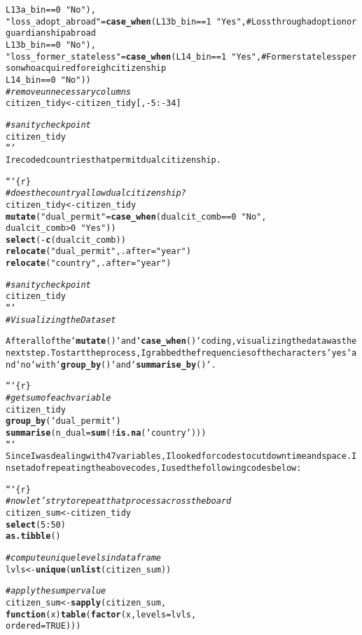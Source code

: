 \documentclass{article}\usepackage[]{graphicx}\usepackage[]{xcolor}
\makeatletter
\newcommand{\hlstr}[1]{\textcolor[rgb]{0.192,0.494,0.8}{#1}}%
\newcommand{\hlcom}[1]{\textcolor[rgb]{0.678,0.584,0.686}{\textit{#1}}}%
\newcommand{\hlkwd}[1]{\textcolor[rgb]{0.737,0.353,0.396}{\textbf{#1}}}%
\newenvironment{kframe}{%
 \def\at@end@of@kframe{}%
 \ifinner\ifhmode%
  \def\at@end@of@kframe{\end{minipage}}%
  \begin{minipage}{\columnwidth}%
 \fi\fi%
 \def\FrameCommand##1{\hskip\@totalleftmargin \hskip-\fboxsep
 \colorbox{shadecolor}{##1}\hskip-\fboxsep
     \hskip-\linewidth \hskip-\@totalleftmargin \hskip\columnwidth}%
 \MakeFramed {\advance\hsize-\width
   \@totalleftmargin\z@ \linewidth\hsize
   \@setminipage}}%
 {\par\unskip\endMakeFramed%
 \at@end@of@kframe}
\newenvironment{knitrout}{}{} %
\makeatother
\begin{document}
\begin{knitrout}
\begin{kframe}
\begin{alltt}
                                         L13a_bin == 0 ~ \hlstr{"No"}),
         \hlstr{"loss_adopt_abroad"} = \hlkwd{case_when}(L13b_bin == 1 ~ \hlstr{"Yes"}, # Loss through adoption or guardianship abroad
                                         L13b_bin == 0 ~ \hlstr{"No"}),
         \hlstr{"loss_former_stateless"} = \hlkwd{case_when}(L14_bin == 1 ~ \hlstr{"Yes"}, # Former stateless person who acquired foreigh citizenship
                                             L14_bin == 0 ~ \hlstr{"No"}))
\hlcom{# remove unnecessary columns }
citizen_tidy <- citizen_tidy[,-5:-34]

\hlcom{# sanity check point}
citizen_tidy
```
I recoded countries that permit dual citizenship.

```\{r\}
\hlcom{# does the country allow dual citizenship?}
citizen_tidy <- citizen_tidy %>%
  \hlkwd{mutate}(\hlstr{"dual_permit"} = \hlkwd{case_when}(dualcit_comb == 0 ~ \hlstr{"No"},
                                   dualcit_comb > 0 ~ \hlstr{"Yes"})) %>%
  \hlkwd{select}(-\hlkwd{c}(dualcit_comb)) %>%
  \hlkwd{relocate}(\hlstr{"dual_permit"}, .after = \hlstr{"year"}) %>%
  \hlkwd{relocate}(\hlstr{"country"}, .after = \hlstr{"year"})

\hlcom{# sanity check point}
citizen_tidy
```
\hlcom{# Visualizing the Dataset}

After all of the `\hlkwd{mutate}()` and `\hlkwd{case_when}()` coding, visualizing the data was the next step. To start the process, I grabbed the frequencies of the characters `yes` and `no` with `\hlkwd{group_by}()` and `\hlkwd{summarise_by}()`. 

```\{r\}
\hlcom{# get sum of each variable}
citizen_tidy %>% 
  \hlkwd{group_by}(`dual_permit`) %>%
  \hlkwd{summarise}(n_dual = \hlkwd{sum}(!\hlkwd{is.na}(`country`)))
```
Since I was dealing with 47 variables, I looked for codes to cut down time and space. Insetad of repeating the above codes, I used the following codes below:

```\{r\}
\hlcom{# now let's try to repeat that process across the board}
citizen_sum <- citizen_tidy %>%
  \hlkwd{select}(5:50) %>%
  \hlkwd{as.tibble}() 

\hlcom{# compute unique levels in data frame}
lvls <- \hlkwd{unique}(\hlkwd{unlist}(citizen_sum))

\hlcom{# apply the sum per value }
citizen_sum <- \hlkwd{sapply}(citizen_sum, 
                      \hlkwd{function}(x) \hlkwd{table}(\hlkwd{factor}(x, levels = lvls, 
                                               ordered = TRUE)))


\end{alltt}
\end{kframe}
\end{knitrout}
\end{document}

